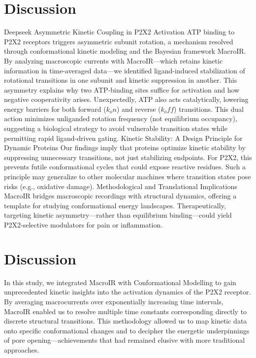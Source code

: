 \documentclass[pdflatex,sn-mathphys-num]{sn-jnl}%
\theoremstyle{thmstyleone}%
\theoremstyle{thmstyletwo}%
\theoremstyle{thmstylethree}%
\begin{document}
\section{Discussion}
Deepseek
Asymmetric Kinetic Coupling in P2X2 Activation
ATP binding to P2X2 receptors triggers asymmetric subunit rotation, a mechanism resolved through conformational kinetic modeling and the Bayesian framework MacroIR. By analyzing macroscopic currents with MacroIR—which retains kinetic information in time-averaged data—we identified ligand-induced stabilization of rotational transitions in one subunit and kinetic suppression in another. This asymmetry explains why two ATP-binding sites suffice for activation and how negative cooperativity arises. Unexpectedly, ATP also acts catalytically, lowering energy barriers for both forward ($k_on$) and reverse ($k_off$) transitions. This dual action minimizes unliganded rotation frequency (not equilibrium occupancy), suggesting a biological strategy to avoid vulnerable transition states while permitting rapid ligand-driven gating.
Kinetic Stability: A Design Principle for Dynamic Proteins
Our findings imply that proteins optimize kinetic stability by suppressing unnecessary transitions, not just stabilizing endpoints. For P2X2, this prevents futile conformational cycles that could expose reactive residues. Such a principle may generalize to other molecular machines where transition states pose risks (e.g., oxidative damage).
Methodological and Translational Implications
MacroIR bridges macroscopic recordings with structural dynamics, offering a template for studying conformational energy landscapes. Therapeutically, targeting kinetic asymmetry—rather than equilibrium binding—could yield P2X2-selective modulators for pain or inflammation.
\section*{Discussion}
In this study, we integrated MacroIR with Conformational Modelling to gain unprecedented kinetic insights into the activation dynamics of the P2X2 receptor. By averaging macrocurrents over exponentially increasing time intervals, MacroIR enabled us to resolve multiple time constants corresponding directly to discrete structural transitions. This methodology allowed us to map kinetic data onto specific conformational changes and to decipher the energetic underpinnings of pore opening—achievements that had remained elusive with more traditional approaches.
\end{document}
